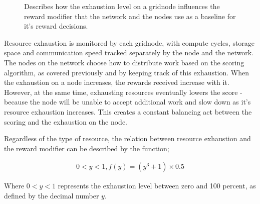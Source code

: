 \documentclass[10pt,a4paper,final]{article}
\begin{document}
\begin{figure}[htb]
	\centering
		\caption{Describes how the exhaustion level on a \gls{gridnode} influences the reward modifier that the network and the nodes use as a baseline for it's reward decisions.}
\end{figure}

\noindent Resource exhaustion is monitored by each \gls{gridnode}, with compute cycles, storage space and communication speed tracked separately by the node and the network. The nodes on the network choose how to distribute work based on the scoring algorithm, as covered previously and by keeping track of this exhaustion. When the exhaustion on a node increases, the rewards received increase with it. However, at the same time, exhausting resources eventually lowers the score - because the node will be unable to accept additional work and slow down as it's resource exhaustion increases. This creates a constant balancing act between the scoring and the exhaustion on the node.

\newpage
\noindent Regardless of the type of resource, the relation between resource exhaustion and the reward modifier can be described by the function;

\[
	\begin{array}{l}
	0 < y < 1, f(y) = (y^3 + 1) \times 0.5
	\end{array}	
\]

\noindent Where $0 < y < 1$ represents the exhaustion level between zero and 100 percent, as defined by the decimal number $y$.
\end{document}
